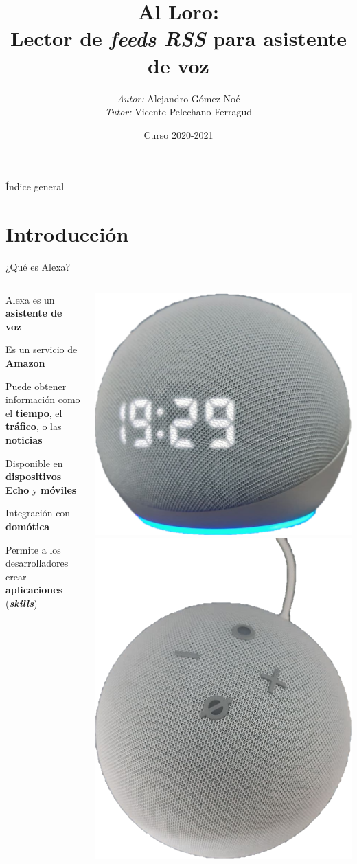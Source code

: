 \documentclass{beamer}
\title{Al Loro: \\Lector de \textit{feeds RSS} para asistente de voz}
\author[Alejandro Gómez Noé]{\emph{Autor:} Alejandro Gómez Noé\\[0.3em]\emph{Tutor:} Vicente Pelechano Ferragud}
\institute{ETSINF - Universidad Politécnica de Valencia}
\date{Curso 2020-2021}
\begin{document}
  
  \begin{frame}
    \titlepage
  \end{frame}
  
  \begin{frame}{Índice general}
    \tableofcontents
  \end{frame}

  \section{Introducción}
 
  \begin{frame}{¿Qué es Alexa?}
    \begin{columns}[c]
      \begin{column}{.51\textwidth}
        \begin{itemize}
          \setlength\itemsep{1.5em}
          {
          \item Alexa es un \textbf{asistente de voz}
          \item Es un servicio de \textbf{Amazon}
          \item Puede obtener información como el \textbf{tiempo}, el \textbf{tráfico}, o las \textbf{noticias}
          }
          {
          \item Disponible en \textbf{dispositivos Echo} y \textbf{móviles}
          \item Integración con \textbf{domótica}
          \item Permite a los desarrolladores crear \textbf{aplicaciones} (\textbf{\emph{skills}})
          }
        \end{itemize}
      \end{column}
      \begin{column}{.49\textwidth}
        \includegraphics[width=.46\textwidth]{echo-dot.png}
        \includegraphics[width=.46\textwidth]{echo-dot-2.png}

\end{column}
\end{columns}
\end{frame}
\end{document}
